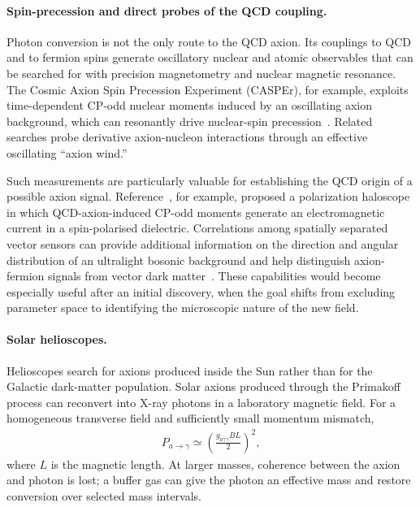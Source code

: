 \documentclass[review]{elsarticle}
\numberwithin{equation}{section}
\numberwithin{table}{section}
\numberwithin{figure}{section}
\begin{document}
\paragraph{Spin-precession and direct probes of the QCD coupling.}

Photon conversion is not the only route to the QCD axion. Its couplings to QCD and to fermion spins generate oscillatory nuclear and atomic observables that can be searched for with precision magnetometry and nuclear magnetic resonance. The Cosmic Axion Spin Precession Experiment (CASPEr), for example, exploits time-dependent CP-odd nuclear moments induced by an oscillating axion background, which can resonantly drive nuclear-spin precession~\cite{Budker:2013hfa}. Related searches probe derivative axion-nucleon interactions through an effective oscillating ``axion wind.''

Such measurements are particularly valuable for establishing the QCD origin of a possible axion signal. Reference~\cite{Berlin:2022mia}, for example, proposed a polarization haloscope in which QCD-axion-induced CP-odd moments generate an electromagnetic current in a spin-polarised dielectric. Correlations among spatially separated vector sensors can provide additional information on the direction and angular distribution of an ultralight bosonic background and help distinguish axion-fermion signals from vector dark matter~\cite{Chen:2021bdr}. These capabilities would become especially useful after an initial discovery, when the goal shifts from excluding parameter space to identifying the microscopic nature of the new field.

\paragraph{Solar helioscopes.}

Helioscopes search for axions produced inside the Sun rather than for the Galactic dark-matter population. Solar axions produced through the Primakoff process can reconvert into X-ray photons in a laboratory magnetic field. For a homogeneous transverse field and sufficiently small momentum mismatch,
\begin{align}
    P_{a\rightarrow\gamma}
    \simeq
    \left(
        \frac{g_{a\gamma\gamma} B L}{2}
    \right)^2,
    \label{eq:axion-helioscope-conversion}
\end{align}
where $L$ is the magnetic length. At larger masses, coherence between the axion and photon is lost; a buffer gas can give the photon an effective mass and restore conversion over selected mass intervals.
\end{document}
